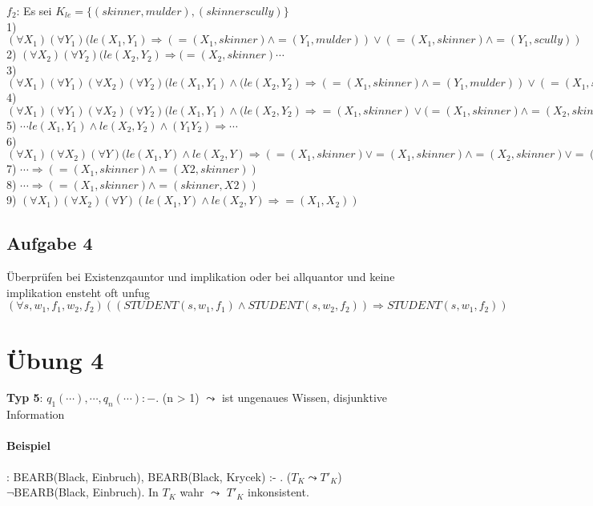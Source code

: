 \documentclass[12pt, a4paper]{article}
\begin{document}
$f_2$: Es sei $K_{le} = \{ (skinner, mulder), (skinner scully) \}$\\
1) $(\forall X_1)(\forall Y_1)(le(X_1, Y_1) \Rightarrow (=(X_1, skinner) \wedge =(Y_1, mulder)) \vee (= (X_1, skinner) \wedge =(Y_1, scully))$\\
2) $(\forall X_2)(\forall Y_2)(le(X_2, Y_2) \Rightarrow (=(X_2, skinner) \cdots$\\
3) $(\forall X_1)(\forall Y_1)(\forall X_2)(\forall Y_2)(le(X_1, Y_1) \wedge (le(X_2, Y_2) \Rightarrow (=(X_1, skinner) \wedge =(Y_1, mulder)) \vee (= (X_1, skinner) \wedge =(Y_1, scully)) \wedge (=(X_2, skinner) \wedge =(Y_2, mulder)) \vee (= (X_2, skinner) \wedge =(Y_2, scully))$\\
4) $(\forall X_1)(\forall Y_1)(\forall X_2)(\forall Y_2)(le(X_1, Y_1) \wedge (le(X_2, Y_2) \Rightarrow =(X_1, skinner) \vee (= (X_1, skinner) \wedge =(X_2, skinner) \vee = (X_2, skinner)$\\
5) $\cdots le(X_1, Y_1) \wedge le(X_2, Y_2) \wedge (Y_1 Y_2) \Rightarrow \cdots$\\
6) $(\forall X_1)(\forall X_2)(\forall Y)(le(X_1, Y) \wedge le (X_2, Y) \Rightarrow (=(X_1, skinner) \vee = (X_1, skinner) \wedge =(X_2, skinner) \vee =(X2, skinner))$\\
7) $\cdots \Rightarrow (=(X_1, skinner) \wedge =(X2, skinner))$\\
8) $\cdots \Rightarrow (=(X_1, skinner) \wedge =(skinner, X2))$\\
9) $(\forall X_1)(\forall X_2)(\forall Y)(le(X_1, Y) \wedge le(X_2, Y) \Rightarrow = (X_1, X_2))$

\subsection*{Aufgabe 4}
Überprüfen bei Existenzqauntor und implikation oder bei allquantor und keine implikation ensteht oft unfug\\

$(\forall s, w_1, f_1, w_2, f_2) ((STUDENT(s, w_1, f_1) \wedge STUDENT(s, w_2, f_2)) \Rightarrow STUDENT(s,w_1, f_2))$

\section*{Übung 4}

\textbf{Typ 5}: $q_1(\cdots), \cdots, q_n(\cdots) :-.$ (n > 1) $\leadsto$ ist ungenaues Wissen, disjunktive Information
\paragraph{Beispiel}: BEARB(Black, Einbruch), BEARB(Black, Krycek) :- . ($T_K \leadsto T'_K$)\\
$\lnot$BEARB(Black, Einbruch). In $T_K$ wahr $\leadsto$ $T'_K$ inkonsistent.
\end{document}
